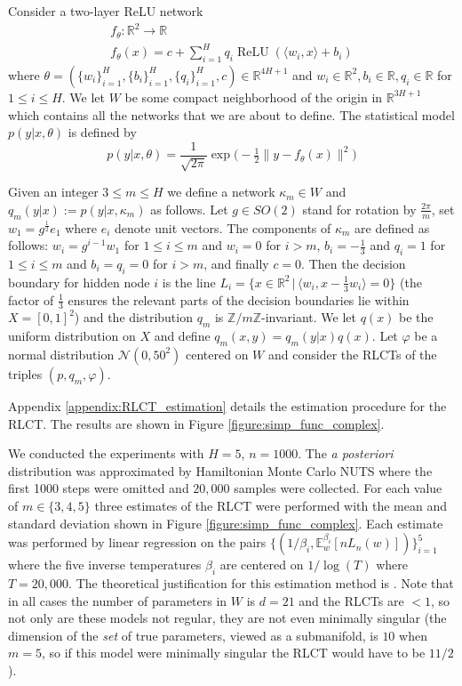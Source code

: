 \documentclass{article} %
\def\l{\,|\,}
\begin{document}
Consider a two-layer ReLU network
\begin{gather*}
f_\theta: \mathbb{R}^2 \longrightarrow \mathbb{R}\\
f_\theta(x) = c + \sum_{i=1}^H q_i \operatorname{ReLU}( \langle w_i, x \rangle + b_i )
\end{gather*}
where $\theta = (\{w_i\}_{i=1}^H, \{b_i\}_{i=1}^H, \{q_i\}_{i=1}^H, c) \in \mathbb{R}^{4H+1}$ and $w_i \in \mathbb{R}^2, b_i \in \mathbb{R}, q_i \in \mathbb{R}$ for $1 \le i \le H$. We let $W$ be some compact neighborhood of the origin in $\mathbb{R}^{3H+1}$ which contains all the networks that we are about to define. The statistical model $p(y|x,\theta)$ is defined by
\begin{equation}
p(y|x, \theta) = \frac{1}{\sqrt{2\pi}} \exp\Big( -\tfrac{1}{2} \| y - f_\theta(x) \|^2 \Big)
\end{equation}

Given an integer $3 \le m \le H$ we define a network $\kappa_m \in W$ and $q_m(y|x) := p(y|x, \kappa_m)$ as follows. Let $g \in SO(2)$ stand for rotation by $\frac{2\pi}{m}$, set $w_1 = g^{\tfrac{1}{2}} e_1$ where $e_i$ denote unit vectors. The components of $\kappa_m$ are defined as follows: $w_i = g^{i-1} w_1$ for $1 \le i \le m$ and $w_i = 0$ for $i > m$, $b_i = - \tfrac{1}{3}$ and $q_i = 1$ for $1 \le i \le m$ and $b_i = q_i = 0$ for $i > m$, and finally $c = 0$. Then the decision boundary for hidden node $i$ is the line $L_i = \{ x \in \mathbb{R}^2 \l \langle w_i, x - \tfrac{1}{3} w_i \rangle = 0 \}$ (the factor of $\tfrac{1}{3}$ ensures the relevant parts of the decision boundaries lie within $X = [0,1]^2$) and the distribution $q_m$ is $\mathbb{Z}/m\mathbb{Z}$-invariant. We let $q(x)$ be the uniform distribution on $X$ and define $q_m(x,y) = q_m(y|x) q(x)$. Let $\varphi$ be a normal distribution $\mathcal{N}(0,50^2)$ centered on $W$ and consider the RLCTs of the triples $(p, q_m, \varphi)$. 

Appendix \ref{appendix:RLCT_estimation} details the estimation procedure for the RLCT. The results are shown in Figure \ref{figure:simp_func_complex}.

We conducted the experiments with $H = 5$, $n = 1000$. The \emph{a posteriori} distribution was approximated by Hamiltonian Monte Carlo NUTS \cite{?} where the first 1000 steps were omitted and $20,000$ samples were collected. For each value of $m \in \{3,4,5\}$ three estimates of the RLCT were performed with the mean and standard deviation shown in Figure \ref{figure:simp_func_complex}. Each estimate was performed by linear regression on the pairs $\{ (1/\beta_i, \mathbb{E}^{\beta_i}_w[ nL_n(w) ] ) \}_{i=1}^5$ where the five inverse temperatures $\beta_i$ are centered on $1/\log(T)$ where $T = 20,000$. The theoretical justification for this estimation method is \citep[Theorem 4]{watanabe_widely_2013}. Note that in all cases the number of parameters in $W$ is $d = 21$ and the RLCTs are $< 1$, so not only are these models not regular, they are not even minimally singular (the dimension of the \emph{set} of true parameters, viewed as a submanifold, is $10$ when $m = 5$, so if this model were minimally singular the RLCT would have to be $11/2$).
\end{document}
